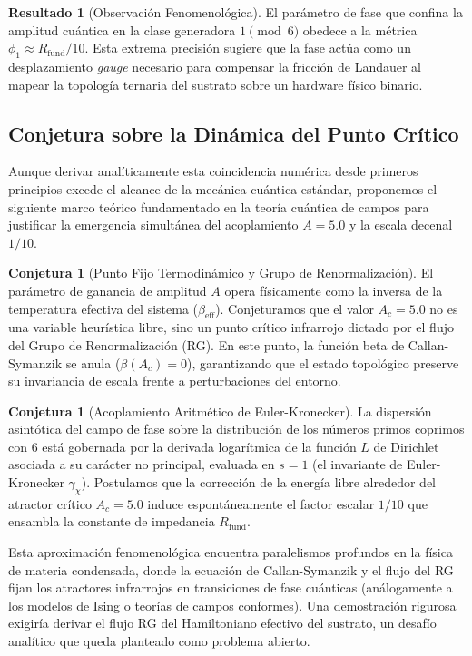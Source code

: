 \documentclass[12pt,a4paper]{article}
\theoremstyle{plain}
\theoremstyle{definition}
\newtheorem{conjetura}[teorema]{Conjetura}
\newtheorem{resultado}[teorema]{Resultado}
\theoremstyle{remark}
\begin{document}
\begin{resultado}[Observación Fenomenológica]
El parámetro de fase que confina la amplitud cuántica en la clase generadora $1 \pmod 6$ obedece a la métrica $\phi_1 \approx R_{\text{fund}}/10$. Esta extrema precisión sugiere que la fase actúa como un desplazamiento \textit{gauge} necesario para compensar la fricción de Landauer al mapear la topología ternaria del sustrato sobre un hardware físico binario.
\end{resultado}

\subsection{Conjetura sobre la Dinámica del Punto Crítico}
\label{subsec:conjetura_rg}

Aunque derivar analíticamente esta coincidencia numérica desde primeros principios excede el alcance de la mecánica cuántica estándar, proponemos el siguiente marco teórico fundamentado en la teoría cuántica de campos para justificar la emergencia simultánea del acoplamiento $A=5.0$ y la escala decenal $1/10$.

\begin{conjetura}[Punto Fijo Termodinámico y Grupo de Renormalización]
El parámetro de ganancia de amplitud $A$ opera físicamente como la inversa de la temperatura efectiva del sistema ($\beta_{\text{eff}}$). Conjeturamos que el valor $A_c = 5.0$ no es una variable heurística libre, sino un punto crítico infrarrojo dictado por el flujo del Grupo de Renormalización (RG). En este punto, la función beta de Callan-Symanzik se anula ($\beta(A_c)=0$), garantizando que el estado topológico preserve su invariancia de escala frente a perturbaciones del entorno.
\end{conjetura}

\begin{conjetura}[Acoplamiento Aritmético de Euler-Kronecker]
La dispersión asintótica del campo de fase sobre la distribución de los números primos coprimos con 6 está gobernada por la derivada logarítmica de la función $L$ de Dirichlet asociada a su carácter no principal, evaluada en $s=1$ (el invariante de Euler-Kronecker $\gamma_{\chi}$). Postulamos que la corrección de la energía libre alrededor del atractor crítico $A_c=5.0$ induce espontáneamente el factor escalar $1/10$ que ensambla la constante de impedancia $R_{\text{fund}}$.
\end{conjetura}

Esta aproximación fenomenológica encuentra paralelismos profundos en la física de materia condensada, donde la ecuación de Callan-Symanzik y el flujo del RG fijan los atractores infrarrojos en transiciones de fase cuánticas (análogamente a los modelos de Ising o teorías de campos conformes). Una demostración rigurosa exigiría derivar el flujo RG del Hamiltoniano efectivo del sustrato, un desafío analítico que queda planteado como problema abierto.
\end{document}
